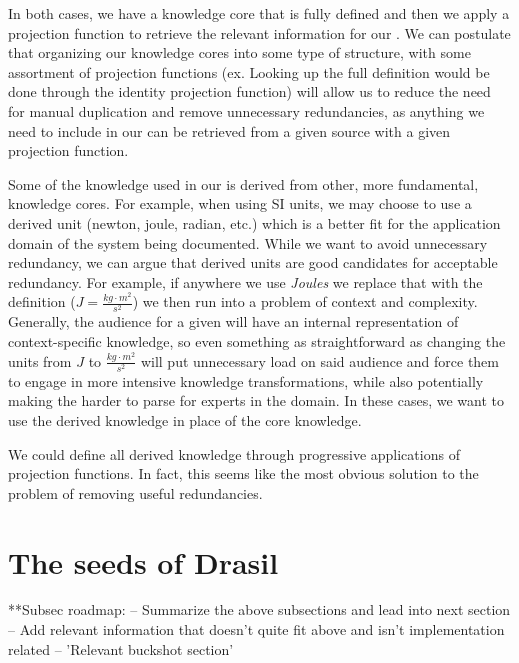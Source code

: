 In both cases, we have a knowledge core that is fully defined and then we apply 
a projection function to retrieve the relevant information for our \sf{}. We 
can postulate that organizing our knowledge cores into some type of structure, 
with some assortment of projection functions (ex. Looking up the full 
definition would be done through the identity projection function) will allow 
us to reduce the need for manual duplication and remove unnecessary 
redundancies, as anything we need to include in our \sfs{} can be retrieved 
from a given source with a given projection function.


Some of the knowledge used in our \sfs{} is derived from other, more 
fundamental, knowledge cores. For example, when using SI units, we may choose 
to use a derived unit (newton, joule, radian, etc.) which 
is a better fit for the application domain of the system being documented. 
While we want to avoid unnecessary redundancy, we can argue that derived units 
are good candidates for acceptable redundancy. For example, if anywhere we use 
\emph{Joules} we replace that with the definition ($J = 
\frac{kg\cdot{}m^2}{s^2}$) we then run into a problem of context and 
complexity. Generally, the audience for a given \sf{} will have an internal 
representation of context-specific knowledge, so even something as 
straightforward as changing the units from $J$ to $\frac{kg\cdot{}m^2}{s^2}$ 
will put unnecessary load on said audience and force them to engage in more 
intensive knowledge transformations, while also potentially making the \sfs{} 
harder to parse for experts in the domain. In these cases, we want to use the 
derived knowledge in place of the core knowledge.

We could define all derived knowledge through progressive applications of 
projection functions. In fact, this seems like the most obvious solution to the 
problem of removing useful redundancies. 
  
\section{The seeds of Drasil}
  **Subsec roadmap:
    -- Summarize the above subsections and lead into next section
    -- Add relevant information that doesn't quite fit above 
      and isn't implementation related
    -- 'Relevant buckshot section'

